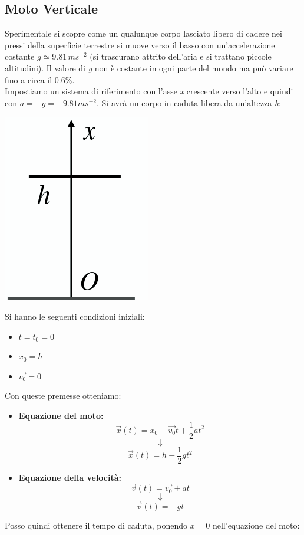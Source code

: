 \documentclass[a4paper,12pt, oneside]{book}
\begin{document}
\subsection{Moto Verticale}
Sperimentale si scopre come un qualunque corpo lasciato libero di cadere nei pressi della superficie terrestre si muove verso il basso con un'accelerazione costante $g\simeq 9.81\, ms^{-2}$ (si trascurano attrito dell'aria e si trattano piccole altitudini). Il valore di \textit{g} non è costante in ogni parte del mondo ma può variare fino a circa il $0.6\%$.\\
Impostiamo un sistema di riferimento con l'asse \textit{x} crescente verso l'alto e quindi con $a=-g=-9.81 ms^{-2}$. Si avrà un corpo in caduta libera da un'altezza \textit{h}:
\begin{center}
	\includegraphics[scale=0.3]{img/vert.png}
\end{center}
Si hanno le seguenti condizioni iniziali:
\begin{itemize}
	\item $t=t_0=0$
	\item $x_0=h$
	\item $\vec{v_0}=0$
\end{itemize}
Con queste premesse otteniamo:
\begin{itemize}
	\item \textbf{Equazione del moto:}
	      $$\vec{x}(t)=x_0+\vec{v_0} t+\frac{1}{2} a  t^2$$
	      $$\downarrow$$
	      $$\vec{x}(t)=h-\frac{1}{2} g t^2$$
	\item \textbf{Equazione della velocità:}
	      $$\vec{v}(t)=\vec{v_0}+a t$$
	      $$\downarrow$$
	      $$\vec{v}(t)=-g t$$
\end{itemize}
Posso quindi ottenere il tempo di caduta, ponendo $x=0$ nell'equazione del moto:
\end{document}
